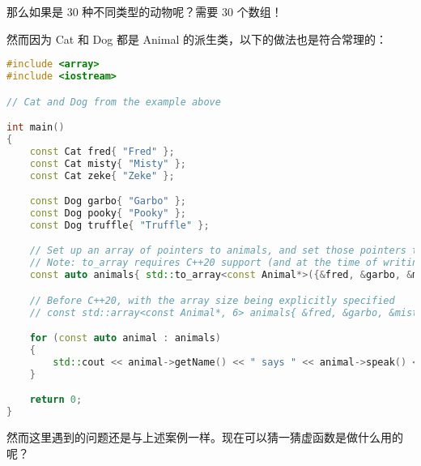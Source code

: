 \documentclass[../../LearnCpp.tex]{subfiles}
\begin{document}
那么如果是 30 种不同类型的动物呢？需要 30 个数组！

然而因为 Cat 和 Dog 都是 Animal 的派生类，以下的做法也是符合常理的：

\begin{lstlisting}[language=C++]
#include <array>
#include <iostream>

// Cat and Dog from the example above

int main()
{
    const Cat fred{ "Fred" };
    const Cat misty{ "Misty" };
    const Cat zeke{ "Zeke" };

    const Dog garbo{ "Garbo" };
    const Dog pooky{ "Pooky" };
    const Dog truffle{ "Truffle" };

    // Set up an array of pointers to animals, and set those pointers to our Cat and Dog objects
    // Note: to_array requires C++20 support (and at the time of writing, Visual Studio 2022 still doesn't support it correctly)
    const auto animals{ std::to_array<const Animal*>({&fred, &garbo, &misty, &pooky, &truffle, &zeke }) };

    // Before C++20, with the array size being explicitly specified
    // const std::array<const Animal*, 6> animals{ &fred, &garbo, &misty, &pooky, &truffle, &zeke };

    for (const auto animal : animals)
    {
        std::cout << animal->getName() << " says " << animal->speak() << '\n';
    }

    return 0;
}
\end{lstlisting}

然而这里遇到的问题还是与上述案例一样。现在可以猜一猜虚函数是做什么用的呢？
\end{document}
